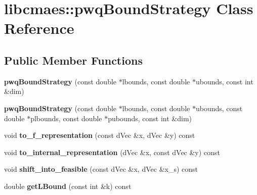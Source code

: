 \hypertarget{classlibcmaes_1_1pwqBoundStrategy}{\section{libcmaes\-:\-:pwq\-Bound\-Strategy Class Reference}
\label{classlibcmaes_1_1pwqBoundStrategy}
}
\subsection*{Public Member Functions}
\begin{DoxyCompactItemize}
\item 
\hypertarget{classlibcmaes_1_1pwqBoundStrategy_a37f4c3ff6a558e20fa6c80a5b59ce497}{{\bfseries pwq\-Bound\-Strategy} (const double $\ast$lbounds, const double $\ast$ubounds, const int \&dim)}\label{classlibcmaes_1_1pwqBoundStrategy_a37f4c3ff6a558e20fa6c80a5b59ce497}

\item 
\hypertarget{classlibcmaes_1_1pwqBoundStrategy_a211f627d589847afe171160a0928ecc7}{{\bfseries pwq\-Bound\-Strategy} (const double $\ast$lbounds, const double $\ast$ubounds, const double $\ast$plbounds, const double $\ast$pubounds, const int \&dim)}\label{classlibcmaes_1_1pwqBoundStrategy_a211f627d589847afe171160a0928ecc7}

\item 
\hypertarget{classlibcmaes_1_1pwqBoundStrategy_aebb3b92377ce6e90c34890420607c246}{void {\bfseries to\-\_\-f\-\_\-representation} (const d\-Vec \&x, d\-Vec \&y) const }\label{classlibcmaes_1_1pwqBoundStrategy_aebb3b92377ce6e90c34890420607c246}

\item 
\hypertarget{classlibcmaes_1_1pwqBoundStrategy_ab742d773ac7cd6dba47bfff7b03d213f}{void {\bfseries to\-\_\-internal\-\_\-representation} (d\-Vec \&x, const d\-Vec \&y) const }\label{classlibcmaes_1_1pwqBoundStrategy_ab742d773ac7cd6dba47bfff7b03d213f}

\item 
\hypertarget{classlibcmaes_1_1pwqBoundStrategy_a7fce5a91cf5a8f4c1b7b0743b58d4e6e}{void {\bfseries shift\-\_\-into\-\_\-feasible} (const d\-Vec \&x, d\-Vec \&x\-\_\-s) const }\label{classlibcmaes_1_1pwqBoundStrategy_a7fce5a91cf5a8f4c1b7b0743b58d4e6e}

\item 
\hypertarget{classlibcmaes_1_1pwqBoundStrategy_a8f16e0a370f358bf82517b566763b8f1}{double {\bfseries get\-L\-Bound} (const int \&k) const }\label{classlibcmaes_1_1pwqBoundStrategy_a8f16e0a370f358bf82517b566763b8f1}


\end{DoxyCompactItemize}
